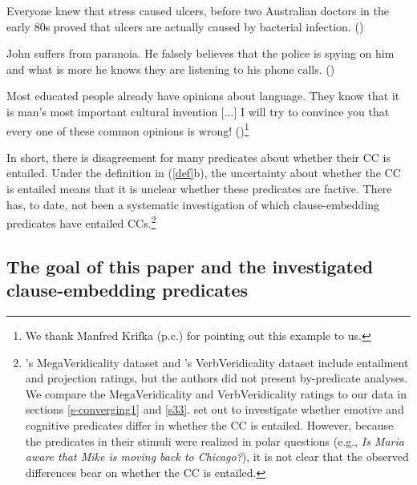 \documentclass[11pt,fleqn]{article}
\newcommand{\6}{\mbox{$[\hspace*{-.6mm}[$}}
\newcommand{\9}{\mbox{$]\hspace*{-.6mm}]$}}
\newcommand{\citepos}[1]{\citeauthor{#1}'s \citeyear{#1}}
\begin{document}
\begin{exe}
\ex\label{know}
\begin{xlist}
\ex Everyone knew that stress caused ulcers, before two Australian doctors in the early 80s proved that ulcers are actually caused by bacterial infection. \hfill (\citealt[501]{hazlett2010})

\ex John suffers from paranoia. He falsely believes that the police is spying on him and what is more he knows they are listening to his phone calls. \hfill (\citealt[514]{abrusan2011})

\ex Most educated people already have opinions about language. They know that it is man's most important cultural invention [...] I will try to convince you that every one of these common opinions is wrong! \hfill (\citealt[17f.]{pinker94})\footnote{We thank Manfred Krifka (p.c.) for pointing out this example to us.}

\end{xlist}
\end{exe}

In short, there is disagreement for many predicates about whether their CC is entailed. Under the definition in (\ref{def}b), the uncertainty about whether the CC is entailed means that it is unclear whether these predicates are factive. There has, to date, not been a systematic investigation of which clause-embedding predicates have entailed CCs.\footnote{\citepos{white-rawlins-nels2018} MegaVeridicality dataset  and \citepos{ross-pavlick2019} VerbVeridicality dataset  include entailment and projection ratings, but the authors did not present by-predicate analyses. We compare the MegaVeridicality and VerbVeridicality ratings to our data in sections \ref{s-converging1} and  \ref{s33}. \citet{djaerv-etal2016} set out to investigate whether emotive and cognitive predicates differ in whether the CC is entailed. However, because the predicates in their stimuli were realized in polar questions (e.g., {\em Is Maria aware that Mike is moving back to Chicago?}), it is not clear that the observed differences bear on whether the CC is entailed.} 

\subsection{The goal of this paper and the investigated clause-embedding predicates}
\end{document}
